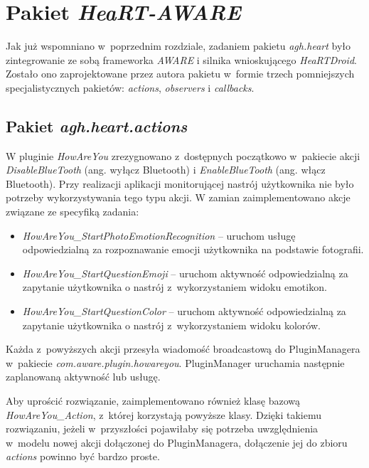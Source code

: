 
\section{Pakiet \textit{HeaRT-AWARE}}
\label{sec:pakietHeartAware2}

Jak już wspomniano w~poprzednim rozdziale, zadaniem pakietu \textit{agh.heart} było zintegrowanie ze sobą frameworka \textit{AWARE} i silnika wnioskującego \textit{HeaRTDroid}. Zostało ono zaprojektowane przez autora pakietu w~formie trzech pomniejszych specjalistycznych pakietów: \textit{actions}, \textit{observers} i \textit{callbacks}\cite{heartaware}.

\subsection{Pakiet \textit{agh.heart.actions}}

W pluginie \textit{HowAreYou} zrezygnowano z~dostępnych początkowo w~pakiecie akcji \textit{DisableBlueTooth} (ang. wyłącz Bluetooth) i \textit{EnableBlueTooth} (ang. włącz Bluetooth). Przy realizacji aplikacji monitorującej nastrój użytkownika nie było potrzeby wykorzystywania tego typu akcji. W zamian zaimplementowano akcje związane ze specyfiką zadania:

\begin{itemize}
	\item \textit{HowAreYou\_StartPhotoEmotionRecognition} -- uruchom usługę odpowiedzialną za rozpoznawanie emocji użytkownika na podstawie fotografii.
	\item \textit{HowAreYou\_StartQuestionEmoji} -- uruchom aktywność odpowiedzialną za zapytanie użytkownika o nastrój z~wykorzystaniem widoku emotikon.
	\item \textit{HowAreYou\_StartQuestionColor} -- uruchom aktywność odpowiedzialną za zapytanie użytkownika o nastrój z~wykorzystaniem widoku kolorów.
\end{itemize}

Każda z~powyższych akcji przesyła wiadomość broadcastową do PluginManagera w~pakiecie \textit{com.aware.plugin.howareyou}. PluginManager uruchamia następnie zaplanowaną aktywność lub usługę. 

Aby uprościć rozwiązanie, zaimplementowano również klasę bazową \textit{HowAreYou\_Action}, z~której korzystają powyższe klasy. Dzięki takiemu rozwiązaniu, jeżeli w~przyszłości pojawiłaby się potrzeba uwzględnienia w~modelu nowej akcji dołączonej do PluginManagera, dołączenie jej do zbioru \textit{actions} powinno być bardzo proste.


